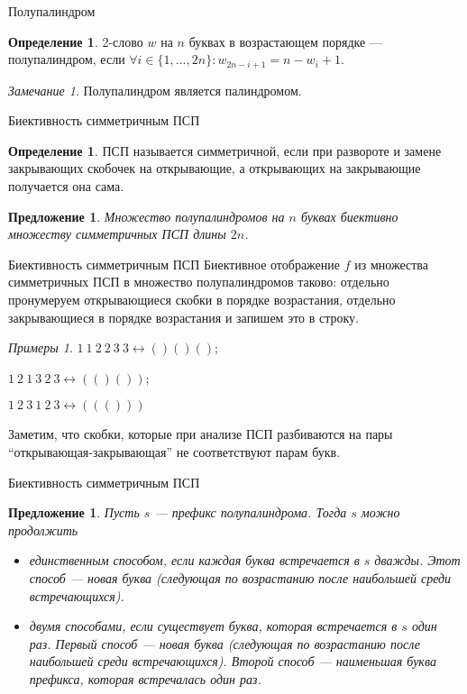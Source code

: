 \documentclass[14pt, aspectratio=169, notheorems]{beamer}
\theoremstyle{plain}
\newtheorem{proposition}[theorem]{Предложение}
\theoremstyle{definition}
\newtheorem{definition}[theorem]{Определение}
\theoremstyle{remark}
\newtheorem{examples}[theorem]{Примеры}
\newtheorem{remark}[theorem]{Замечание}
\begin{document}
\begin{frame}{Полупалиндром}
   \begin{definition}
    2-слово $w$ на $n$ буквах в возрастающем порядке --- полупалиндром, если $\forall i \in \{1, \dots, 2n\}:  w_{2n - i + 1} = n - w_i + 1$.
    \end{definition}
    \begin{remark}
    Полупалиндром является палиндромом.
    \end{remark}
\end{frame}

\begin{frame}{Биективность симметричным ПСП}
    \begin{definition}
        ПСП называется симметричной, если при развороте и замене закрывающих скобочек на открывающие, а открывающих на закрывающие получается она сама.
    \end{definition}
    \begin{proposition}
    Множество полупалиндромов на $n$ буквах биективно множеству симметричных ПСП длины $2n$.
    \end{proposition}
\end{frame}

\begin{frame}{Биективность симметричным ПСП}
    Биективное отображение $f$ из множества симметричных ПСП в множество полупалиндромов таково: отдельно пронумеруем открывающиеся скобки в порядке возрастания, отдельно закрывающиеся в порядке возрастания и запишем это в строку. 
    \begin{examples}
       $1\ 1\ 2\ 2\ 3\ 3 \longleftrightarrow ()()()$; 
       
       $1\ 2\ 1\ 3\ 2\ 3 \longleftrightarrow (()())$;
       
       $1\ 2\ 3\ 1\ 2\ 3 \longleftrightarrow ((())) $ 
    \end{examples}
    Заметим, что скобки, которые при анализе ПСП разбиваются на пары ``открывающая-закрывающая'' не соответствуют парам букв.
\end{frame}

\begin{frame}{Биективность симметричным ПСП}
    \begin{proposition}
    Пусть $s$ --- префикс полупалиндрома. Тогда $s$ можно продолжить 
    \begin{itemize}
        \item единственным способом, если каждая буква встречается в $s$ дважды. Этот способ --- новая буква (следующая по возрастанию после наибольшей среди встречающихся).
        \item двумя способами, если существует буква, которая встречается в $s$ один раз. Первый способ --- новая буква (следующая по возрастанию после наибольшей среди встречающихся). Второй способ --- наименьшая буква префикса, которая встречалась один раз.
    \end{itemize}
    \end{proposition}
\end{frame}
\end{document}
